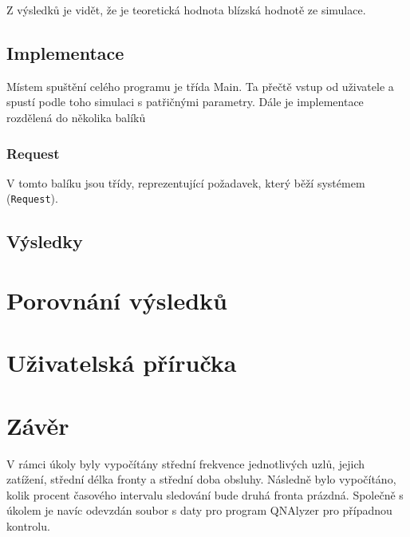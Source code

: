 \documentclass{article}
\begin{document}
Z výsledků je vidět, že je teoretická hodnota blízská hodnotě ze simulace.


\subsection{Implementace}
Místem spuštění celého programu je třída Main. 
Ta přečtě vstup od uživatele a spustí podle toho simulaci s patřičnými parametry.
Dále je implementace rozdělená do několika balíků

\subsubsection{Request}
V tomto balíku jsou třídy, reprezentující požadavek, který běží systémem (\texttt{Request}). 
\subsection{Výsledky}

\section{Porovnání výsledků}

\section{Uživatelská příručka}

\section{Závěr} %
V rámci úkoly byly vypočítány střední frekvence jednotlivých uzlů, jejich zatížení, střední délka fronty a střední doba obsluhy. Následně bylo vypočítáno, kolik procent časového intervalu sledování bude druhá fronta prázdná. Společně s úkolem je navíc odevzdán soubor s daty pro program QNAlyzer pro případnou kontrolu.
\end{document}
